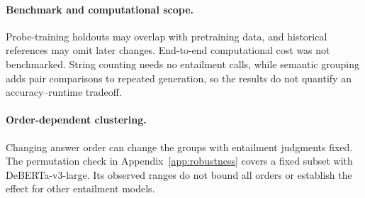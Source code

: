 \paragraph{Benchmark and computational scope.}
Probe-training holdouts may overlap with pretraining data, and historical
references may omit later changes. End-to-end computational cost was not
benchmarked. String counting needs no entailment calls, while semantic grouping
adds pair comparisons to repeated generation, so the results do not quantify
an accuracy--runtime tradeoff.

\paragraph{Order-dependent clustering.}
Changing answer order can change the groups with entailment judgments fixed.
The permutation check in Appendix~\ref{app:robustness} covers a fixed subset
with DeBERTa-v3-large. Its observed ranges do not bound all orders or establish
the effect for other entailment models.
